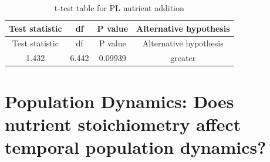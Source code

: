 \documentclass[]{article}
\begin{document}
\begin{longtable}[]{@{}cccc@{}}
\caption{t-test table for PL nutrient addition}\tabularnewline
\toprule
\begin{minipage}[b]{0.21\columnwidth}\centering\strut
Test statistic
\strut\end{minipage} &
\begin{minipage}[b]{0.07\columnwidth}\centering\strut
df
\strut\end{minipage} &
\begin{minipage}[b]{0.12\columnwidth}\centering\strut
P value
\strut\end{minipage} &
\begin{minipage}[b]{0.30\columnwidth}\centering\strut
Alternative hypothesis
\strut\end{minipage}\tabularnewline
\midrule
\endfirsthead
\toprule
\begin{minipage}[b]{0.21\columnwidth}\centering\strut
Test statistic
\strut\end{minipage} &
\begin{minipage}[b]{0.07\columnwidth}\centering\strut
df
\strut\end{minipage} &
\begin{minipage}[b]{0.12\columnwidth}\centering\strut
P value
\strut\end{minipage} &
\begin{minipage}[b]{0.30\columnwidth}\centering\strut
Alternative hypothesis
\strut\end{minipage}\tabularnewline
\midrule
\endhead
\begin{minipage}[t]{0.21\columnwidth}\centering\strut
1.432
\strut\end{minipage} &
\begin{minipage}[t]{0.07\columnwidth}\centering\strut
6.442
\strut\end{minipage} &
\begin{minipage}[t]{0.12\columnwidth}\centering\strut
0.09939
\strut\end{minipage} &
\begin{minipage}[t]{0.30\columnwidth}\centering\strut
greater
\strut\end{minipage}\tabularnewline
\bottomrule
\end{longtable}

\newpage

\section{Population Dynamics: Does nutrient stoichiometry affect
temporal population
dynamics?}\label{population-dynamics-does-nutrient-stoichiometry-affect-temporal-population-dynamics}
\end{document}
